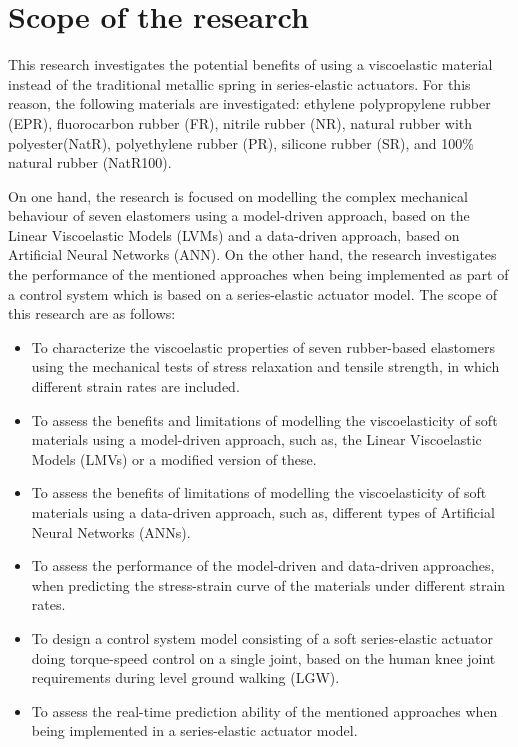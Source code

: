 \section{Scope of the research}

This research investigates the potential benefits of using a viscoelastic material instead of the traditional metallic spring in series-elastic actuators. For this reason, the following materials are investigated: ethylene polypropylene rubber (EPR), fluorocarbon rubber (FR), nitrile rubber (NR), natural rubber with polyester(NatR),  polyethylene  rubber  (PR),  silicone  rubber  (SR), and  100\% natural rubber (NatR100).

On one hand, the research is focused on modelling the complex mechanical behaviour of seven elastomers using a model-driven approach, based on the Linear Viscoelastic Models (LVMs) and a data-driven approach, based on Artificial Neural Networks (ANN). On the other hand, the research investigates the performance of the mentioned approaches when being implemented as part of a control system which is based on a series-elastic actuator model. The scope of this research are as follows:

\begin{itemize}
    \item To characterize the viscoelastic properties of seven rubber-based elastomers using the mechanical tests of stress relaxation and tensile strength, in which different strain rates are included.
    \item To assess the benefits and limitations of modelling the viscoelasticity of soft materials using a model-driven approach, such as, the Linear Viscoelastic Models (LMVs) or a modified version of these.
    \item To assess the benefits of limitations of modelling the viscoelasticity of soft materials using a data-driven approach, such as, different types of Artificial Neural Networks (ANNs).
    \item To assess the performance of the model-driven and data-driven approaches, when predicting the stress-strain curve of the materials under different strain rates.
    \item To design a control system model consisting of a soft series-elastic actuator doing torque-speed control on a single joint, based on the human knee joint requirements during level ground walking (LGW).
    \item To assess the real-time prediction ability of the mentioned approaches when being implemented in a series-elastic actuator model.
\end{itemize}


